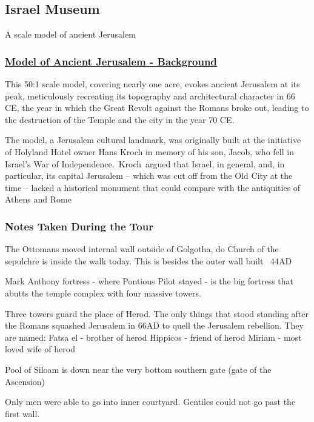 \documentclass[letterpaper]{report}
\begin{document}
\subsection{Israel Museum}
A scale model of ancient Jerusalem
\begin{multicols}{2}

\subsubsection{	\href{http://www.english.imjnet.org.il/page_1382}{
Model of Ancient Jerusalem -  Background}}
This 50:1 scale model, covering nearly one acre, evokes ancient Jerusalem at its peak, meticulously recreating its topography and architectural character in 66 CE, the year in which the Great Revolt against the Romans broke out, leading to the destruction of the Temple and the city in the year 70 CE. 

The model, a Jerusalem cultural landmark, was originally built at the initiative of Holyland Hotel owner Hans Kroch in memory of his son, Jacob, who fell in Israel's War of Independence. Kroch argued that Israel, in general, and, in particular, its capital Jerusalem – which was cut off from the Old City at the time – lacked a historical monument that could compare with the antiquities of Athens and Rome

\subsubsection{Notes Taken During the Tour}
The Ottomans moved internal wall outside of Golgotha, do Church of the sepulchre is inside the walk today. This is besides the outer wall built ~44AD

Mark Anthony fortress - where Pontious Pilot stayed -
is the big fortress that abutts the temple complex with four massive towers.

Three towers guard the place of Herod. The only things that stood standing after the Romans squashed Jerusalem in 66AD to quell the Jerusalem rebellion. They are named:
Fatsa el - brother of herod
Hippicos - friend of herod
Miriam - most loved wife of herod

Pool of Siloam is down near the very bottom southern gate (gate of the Ascension)

Only men were able to go into inner courtyard. Gentiles could not go past the first wall.

\end{multicols}
\end{document}
